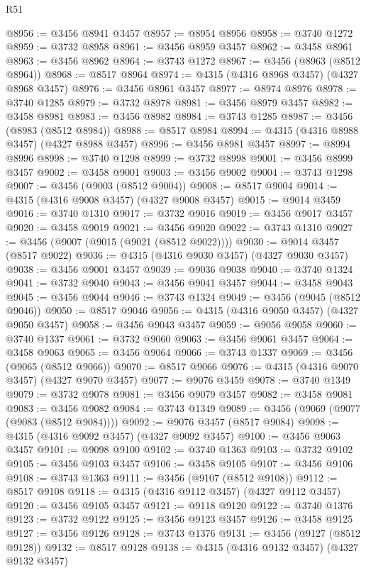 \begin{lexlean}{R51}
\begin{coremodule}
@8956 := @3456 @8941 @3457
@8957 := @8954 @8956
@8958 := @3740 @1272
@8959 := @3732 @8958
@8961 := @3456 @8959 @3457
@8962 := @3458 @8961
@8963 := @3456 @8962
@8964 := @3743 @1272
@8967 := @3456 (@8963 (@8512 @8964))
@8968 := @8517 @8964
@8974 := @4315 (@4316 @8968 @3457) (@4327 @8968 @3457)
@8976 := @3456 @8961 @3457
@8977 := @8974 @8976
@8978 := @3740 @1285
@8979 := @3732 @8978
@8981 := @3456 @8979 @3457
@8982 := @3458 @8981
@8983 := @3456 @8982
@8984 := @3743 @1285
@8987 := @3456 (@8983 (@8512 @8984))
@8988 := @8517 @8984
@8994 := @4315 (@4316 @8988 @3457) (@4327 @8988 @3457)
@8996 := @3456 @8981 @3457
@8997 := @8994 @8996
@8998 := @3740 @1298
@8999 := @3732 @8998
@9001 := @3456 @8999 @3457
@9002 := @3458 @9001
@9003 := @3456 @9002
@9004 := @3743 @1298
@9007 := @3456 (@9003 (@8512 @9004))
@9008 := @8517 @9004
@9014 := @4315 (@4316 @9008 @3457) (@4327 @9008 @3457)
@9015 := @9014 @3459
@9016 := @3740 @1310
@9017 := @3732 @9016
@9019 := @3456 @9017 @3457
@9020 := @3458 @9019
@9021 := @3456 @9020
@9022 := @3743 @1310
@9027 := @3456 (@9007 (@9015 (@9021 (@8512 @9022))))
@9030 := @9014 @3457 (@8517 @9022)
@9036 := @4315 (@4316 @9030 @3457) (@4327 @9030 @3457)
@9038 := @3456 @9001 @3457
@9039 := @9036 @9038
@9040 := @3740 @1324
@9041 := @3732 @9040
@9043 := @3456 @9041 @3457
@9044 := @3458 @9043
@9045 := @3456 @9044
@9046 := @3743 @1324
@9049 := @3456 (@9045 (@8512 @9046))
@9050 := @8517 @9046
@9056 := @4315 (@4316 @9050 @3457) (@4327 @9050 @3457)
@9058 := @3456 @9043 @3457
@9059 := @9056 @9058
@9060 := @3740 @1337
@9061 := @3732 @9060
@9063 := @3456 @9061 @3457
@9064 := @3458 @9063
@9065 := @3456 @9064
@9066 := @3743 @1337
@9069 := @3456 (@9065 (@8512 @9066))
@9070 := @8517 @9066
@9076 := @4315 (@4316 @9070 @3457) (@4327 @9070 @3457)
@9077 := @9076 @3459
@9078 := @3740 @1349
@9079 := @3732 @9078
@9081 := @3456 @9079 @3457
@9082 := @3458 @9081
@9083 := @3456 @9082
@9084 := @3743 @1349
@9089 := @3456 (@9069 (@9077 (@9083 (@8512 @9084))))
@9092 := @9076 @3457 (@8517 @9084)
@9098 := @4315 (@4316 @9092 @3457) (@4327 @9092 @3457)
@9100 := @3456 @9063 @3457
@9101 := @9098 @9100
@9102 := @3740 @1363
@9103 := @3732 @9102
@9105 := @3456 @9103 @3457
@9106 := @3458 @9105
@9107 := @3456 @9106
@9108 := @3743 @1363
@9111 := @3456 (@9107 (@8512 @9108))
@9112 := @8517 @9108
@9118 := @4315 (@4316 @9112 @3457) (@4327 @9112 @3457)
@9120 := @3456 @9105 @3457
@9121 := @9118 @9120
@9122 := @3740 @1376
@9123 := @3732 @9122
@9125 := @3456 @9123 @3457
@9126 := @3458 @9125
@9127 := @3456 @9126
@9128 := @3743 @1376
@9131 := @3456 (@9127 (@8512 @9128))
@9132 := @8517 @9128
@9138 := @4315 (@4316 @9132 @3457) (@4327 @9132 @3457)

\end{coremodule}
\end{lexlean}
